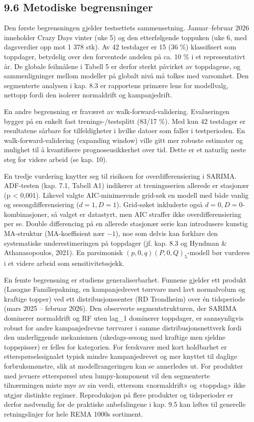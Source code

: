\documentclass[
  norsk,
  11pt,
  a4paper,
]{article}
\begin{document}
\subsection{9.6 Metodiske begrensninger}\label{metodiske-begrensninger}

Den første begrensningen gjelder testsettets sammensetning.
Januar--februar 2026 inneholder Crazy Days vinter (uke 5) og den
etterfølgende toppuken (uke 6, med dagsverdier opp mot 1 378 stk). Av 42
testdager er 15 (36 \%) klassifisert som toppdager, betydelig over den
forventede andelen på ca. 10 \% i et representativt år. De globale
feilmålene i Tabell 5 er derfor sterkt påvirket av toppdagene, og
sammenligninger mellom modeller på globalt nivå må tolkes med varsomhet.
Den segmenterte analysen i kap. 8.3 er rapportens primære lens for
modellvalg, nettopp fordi den isolerer normaldrift og kampanjedrift.

En andre begrensning er fraværet av walk-forward-validering.
Evalueringen bygger på en enkelt fast trenings-/testsplitt (83/17 \%).
Med kun 42 testdager er resultatene sårbare for tilfeldigheter i hvilke
datoer som faller i testperioden. En walk-forward-validering (expanding
window) ville gitt mer robuste estimater og mulighet til å kvantifisere
prognoseusikkerhet over tid. Dette er et naturlig neste steg for videre
arbeid (se kap. 10).

En tredje vurdering knytter seg til risikoen for overdifferensiering i
SARIMA. ADF-testen (kap. 7.1, Tabell A1) indikerer at treningsserien
allerede er stasjonær (p \textless{} 0,001). Likevel valgte
AIC-minimerende grid-søk en modell med både vanlig og
sesongdifferensiering (\(d=1, D=1\)). Grid-søket inkluderte også
\(d=0, D=0\)-kombinasjoner, så valget er datastyrt, men AIC straffer
ikke overdifferensiering per se. Double differencing på en allerede
stasjonær serie kan introdusere kunstig MA-struktur (MA-koeffisient nær
\(-1\)), noe som delvis kan forklare den systematiske underestimeringen
på toppdager (jf. kap. 8.3 og Hyndman \& Athanasopoulos, 2021). En
parsimonisk \((p,0,q)(P,0,Q)_5\)-modell bør vurderes i et videre arbeid
som sensitivitetssjekk.

En femte begrensning er studiens generaliserbarhet. Funnene gjelder ett
produkt (Lasagne Familiepakning, en kampanjedrevet tørrvare med lavt
normalvolum og kraftige topper) ved ett distribusjonssenter (RD
Trondheim) over én tidsperiode (mars 2025 -- februar 2026). Den
observerte segmentstrukturen, der SARIMA dominerer normaldrift og RF
uten lag\_1 dominerer toppdager, er sannsynligvis robust for andre
kampanjedrevne tørrvarer i samme distribusjonsnettverk fordi den
underliggende mekanismen (ukedags-sesong med kraftige men sjeldne
toppspisser) er felles for kategorien. For ferskvarer med kort
holdbarhet er etterspørselssignalet typisk mindre kampanjedrevet og mer
knyttet til daglige forbruksmønstre, slik at modellrangeringen kan se
annerledes ut. For produkter med jevnere etterspørsel uten
lumpy-komponent vil den segmenterte tilnærmingen miste mye av sin verdi,
ettersom «normaldrift» og «toppdag» ikke utgjør distinkte regimer.
Reproduksjon på flere produkter og tidsperioder er derfor nødvendig før
de praktiske anbefalingene i kap. 9.5 kan løftes til generelle
retningslinjer for hele REMA 1000s sortiment.
\end{document}

